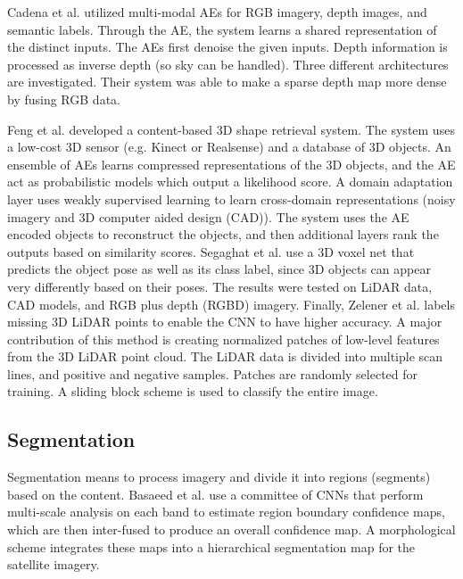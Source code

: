 \documentclass[12pt]{spieman}
\begin{document}
\begin{spacing}{1}
Cadena et al. \cite{Cadena2016} utilized multi-modal AEs for RGB imagery, depth images, and semantic labels. Through the AE, the system learns a shared representation of the distinct inputs. The AEs first denoise the given inputs. Depth information is processed as inverse depth (so sky can be handled). Three different architectures are investigated. Their system was able to make a sparse depth map more dense by fusing RGB data.

Feng et al. \cite{Feng2016} developed a content-based 3D shape retrieval system. The system uses a low-cost 3D sensor (e.g. Kinect or Realsense) and a database of 3D objects. An ensemble of AEs learns compressed representations of the 3D objects, and the AE act as probabilistic models which output a likelihood score. A domain adaptation layer uses weakly supervised learning to learn cross-domain representations (noisy imagery and 3D computer aided design (CAD)). The system uses the AE encoded objects to reconstruct the objects, and then additional layers rank the outputs based on similarity scores. Segaghat et al. \cite{Sedaghat2016} use a 3D voxel net that predicts the object pose as well as its class label, since 3D objects can appear very differently based on their poses. The results were tested on LiDAR data, CAD models, and RGB plus depth (RGBD) imagery. Finally, Zelener et al. \cite{zelener2016cnn} labels missing 3D LiDAR points to enable the CNN to have higher accuracy. A major contribution of this method is creating normalized patches of low-level features from the 3D LiDAR point cloud. The LiDAR data is divided into multiple scan lines, and positive and negative samples. Patches are randomly selected for training. A sliding block scheme is used to classify the entire image.

\subsection{Segmentation}
Segmentation means to process imagery and divide it into regions (segments) based on the content.
Basaeed et al. \cite{basaeed2016supervisedHierarchial} use a committee of CNNs that perform multi-scale analysis on each band to estimate region boundary confidence maps, which are then inter-fused to produce an overall confidence map. A morphological scheme integrates these maps into a hierarchical segmentation map for the satellite imagery.


\end{spacing}
\end{document}
